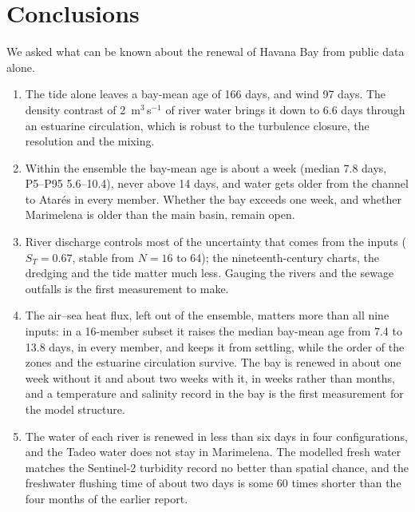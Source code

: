\documentclass[a4paper,fleqn]{ems-dc}
\begin{document}
\section{Conclusions}\label{sec:conclusions}
We asked what can be known about the renewal of Havana Bay from public data alone.

\begin{enumerate}[label=(\arabic*),leftmargin=2.2em,itemsep=0pt]
\item The tide alone leaves a bay-mean age of 166 days, and wind 97 days. The density
contrast of 2~m$^3$\,s$^{-1}$ of river water brings it down to 6.6 days through an estuarine
circulation, which is robust to the turbulence closure, the resolution and the mixing.
\item Within the ensemble the bay-mean age is about a week (median 7.8 days, P5--P95
5.6--10.4), never above 14 days, and water gets older from the channel to Atar\'es in every
member. Whether the bay exceeds one week, and whether Marimelena is older than the main
basin, remain open.
\item River discharge controls most of the uncertainty that comes from the inputs
($S_T = 0.67$, stable from $N = 16$ to 64); the nineteenth-century charts, the dredging and
the tide matter much less. Gauging the rivers and the sewage outfalls is the first
measurement to make.
\item The air--sea heat flux, left out of the ensemble, matters more than all nine inputs:
in a 16-member subset it raises the median bay-mean age from 7.4 to 13.8 days, in every
member, and keeps it from settling, while the order of the zones and the estuarine
circulation survive. The bay is renewed in about one week without it and about two weeks
with it, in weeks rather than months, and a temperature and salinity record in the bay is
the first measurement for the model structure.
\item The water of each river is renewed in less than six days in four configurations, and
the Tadeo water does not stay in Marimelena. The modelled fresh water matches the Sentinel-2
turbidity record no better than spatial chance, and the freshwater flushing time of about
two days is some 60 times shorter than the four months of the earlier report.
\end{enumerate}

\end{document}
